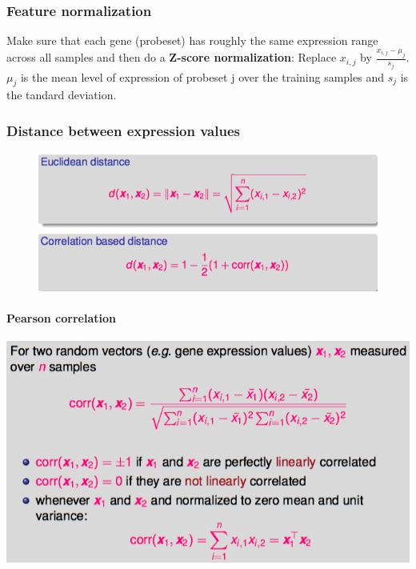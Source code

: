 \subsubsection{Feature normalization}

Make sure that each gene (probeset) has roughly the same expression range across all samples and then do a \textbf{Z-score normalization}: Replace $x_{i,j}$ by $\frac{x_{i,j} - \mu_j}{s_j}$. $\mu_j$ is the mean level of expression of probeset j over the training samples and $s_j$ is the tandard deviation.

\subsubsection{Distance between expression values}

\begin{figure}[H]
	\centering
	\includegraphics[scale=0.5]{images/51_distance.png}
\end{figure}

\paragraph{Pearson correlation}

\begin{center}
	\includegraphics[scale=0.6]{images/52_pearson.png}
\end{center}

